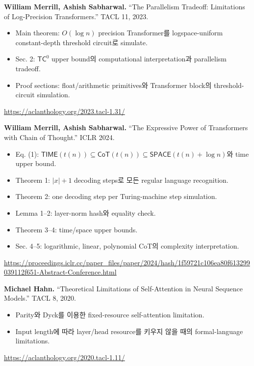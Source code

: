 \documentclass[11pt,a4paper,oneside,openany]{memoir}
\theoremstyle{definition}
\newcommand{\TIME}{\mathsf{TIME}}
\newcommand{\SPACE}{\mathsf{SPACE}}
\newcommand{\TC}{\mathsf{TC}}
\newcommand{\CoT}{\mathsf{CoT}}
\begin{document}
\vspace{0.8em}
\textbf{William Merrill, Ashish Sabharwal.}
``The Parallelism Tradeoff: Limitations of Log-Precision Transformers.'' TACL 11, 2023.

\begin{itemize}
  \item Main theorem: $O(\log n)$ precision Transformer를 logspace-uniform constant-depth threshold circuit로 simulate.
  \item Sec. 2: $\TC^0$ upper bound의 computational interpretation과 parallelism tradeoff.
  \item Proof sections: float/arithmetic primitives와 Transformer block의 threshold-circuit simulation.
\end{itemize}
\url{https://aclanthology.org/2023.tacl-1.31/}

\vspace{0.8em}
\textbf{William Merrill, Ashish Sabharwal.}
``The Expressive Power of Transformers with Chain of Thought.'' ICLR 2024.

\begin{itemize}
  \item Eq. (1): $\TIME(t(n))\subseteq\CoT(t(n))\subseteq\SPACE(t(n)+\log n)$와 time upper bound.
  \item Theorem 1: $|x|+1$ decoding steps로 모든 regular language recognition.
  \item Theorem 2: one decoding step per Turing-machine step simulation.
  \item Lemma 1--2: layer-norm hash와 equality check.
  \item Theorem 3--4: time/space upper bounds.
  \item Sec. 4--5: logarithmic, linear, polynomial CoT의 complexity interpretation.
\end{itemize}
\url{https://proceedings.iclr.cc/paper_files/paper/2024/hash/1f59721c106ea80f613299039112f651-Abstract-Conference.html}

\vspace{0.8em}
\textbf{Michael Hahn.}
``Theoretical Limitations of Self-Attention in Neural Sequence Models.'' TACL 8, 2020.

\begin{itemize}
  \item Parity와 Dyck를 이용한 fixed-resource self-attention limitation.
  \item Input length에 따라 layer/head resource를 키우지 않을 때의 formal-language limitations.
\end{itemize}
\url{https://aclanthology.org/2020.tacl-1.11/}
\end{document}
